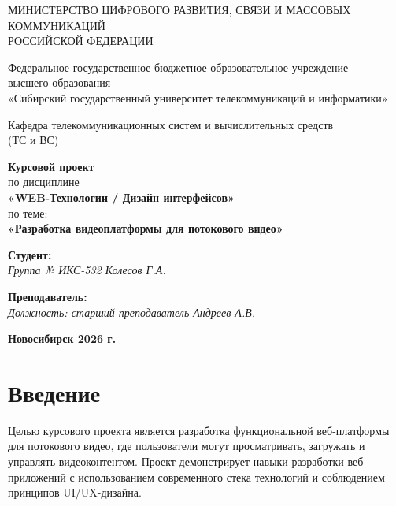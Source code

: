\documentclass[12pt]{article}
\begin{document}
\thispagestyle{empty}
\begin{center}
    МИНИСТЕРСТВО ЦИФРОВОГО РАЗВИТИЯ, СВЯЗИ И МАССОВЫХ КОММУНИКАЦИЙ \\
    РОССИЙСКОЙ ФЕДЕРАЦИИ
    \vspace{20pt}

    Федеральное государственное бюджетное образовательное учреждение \\
    высшего образования \\
    «Сибирский государственный университет телекоммуникаций и информатики»
    \vspace{20pt}

    Кафедра телекоммуникационных систем и вычислительных средств \\
    (ТС и ВС)
\end{center}

\vspace{3cm}

\begin{center}
    \textbf{Курсовой проект} \\[10pt]
    по дисциплине \\
    \textbf{«WEB-Технологии / Дизайн интерфейсов»} \\[10pt]
    по теме: \\
    \textbf{«Разработка видеоплатформы для потокового видео»}
\end{center}

\vspace{3cm}

\begin{flushleft}
    \textbf{Студент:} \\
    \textit{Группа № ИКС-532 \hfill Колесов Г.А.}
    \vspace{20pt}
    
    \textbf{Преподаватель:} \\
    \textit{Должность: старший преподаватель \hfill Андреев А.В.}
\end{flushleft}

\vfill
\begin{center}
    \textbf{Новосибирск 2026 г.}
\end{center}

\newpage

\section{Введение}

Целью курсового проекта является разработка функциональной веб-платформы для потокового видео, где пользователи могут просматривать, загружать и управлять видеоконтентом. Проект демонстрирует навыки разработки веб-приложений с использованием современного стека технологий и соблюдением принципов UI/UX-дизайна.
\end{document}
